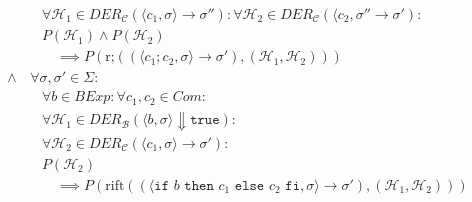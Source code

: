 \begin{align*}
																		                  & \quad \forall \mathcal{H} _ 1 \in \textit{DER} _ \mathcal{C} (\langle c _ 1, \sigma \rangle \rightarrow \sigma'') : \forall \mathcal{H} _ 2 \in \textit{DER} _ \mathcal{C} (\langle c _ 2, \sigma'' \rightarrow \sigma') : \\
																		                  & \quad P(\mathcal{H} _ 1) \land P(\mathcal{H} _ 2)                                                                                                                                                                          \\
																		                  & \quad\quad \implies P(\text{r;}((\langle c _ 1 ; c _ 2, \sigma \rangle \rightarrow \sigma'), (\mathcal{H} _ 1, \mathcal{H} _ 2)))                                                                                          \\
																		\land             & \,\forall \sigma, \sigma' \in \Sigma :                                                                                                                                                                                     \\
																		                  & \quad \forall b \in \textit{BExp} : \forall c _ 1, c _ 2 \in \textit{Com} :                                                                                                                                                \\
																		                  & \quad \forall \mathcal{H} _ 1 \in \textit{DER} _ \mathcal{B} (\langle b, \sigma \rangle \Downarrow \texttt{true}) :                                                                                                        \\
																		                  & \quad \forall \mathcal{H} _ 2 \in \textit{DER} _ \mathcal{C} (\langle c _ 1, \sigma \rangle \rightarrow \sigma') :                                                                                                         \\
																		                  & \quad P(\mathcal{H} _ 2)                                                                                                                                                                                                   \\
																		                  & \quad\quad \implies P(\text{rift}((\langle \texttt{if } b \texttt{ then } c _ 1 \texttt{ else } c _ 2 \texttt{ fi}, \sigma \rangle \rightarrow \sigma'), (\mathcal{H} _ 1, \mathcal{H} _ 2)))                              \\

\end{align*}
